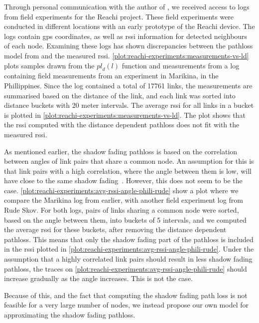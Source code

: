 Through personal communication with the author of \cite{paper:linkmodel}, we received access to logs from
field experiments for the Reachi project. These field experiments were conducted in different locations with
an early prototype of the Reachi device. The logs contain \gls{gps} coordinates, as well as \gls{rssi}
information for detected neighbours of each node. Examining these logs has shown discrepancies between the
\gls{pathloss} model from \cite{paper:linkmodel} and the measured \gls{rssi}.
\autoref{plot:reachi-experiments:measurements-vs-ld} plots samples drawn from the $\mathit{pl}_d(l)$ function
and measurements from a log containing field measurements from an experiment in Marikina, in the Phillippines.
Since the log contained a total of 17761 links, the measurements are summarised based on the distance of the
link, and each link was sorted into distance buckets with 20 meter intervals. The average \gls{rssi} for all
links in a bucket is plotted in \autoref{plot:reachi-experiments:measurements-vs-ld}. The plot shows that the
\gls{rssi} computed with the distance dependent \gls{pathloss} does not fit with the measured \gls{rssi}.
\medbreak

As mentioned earlier, the shadow fading \gls{pathloss} is based on the correlation between angles of link
pairs that share a common node. An assumption for this is that link pairs with a high correlation, where the
angle between them is low, will have close to the same shadow fading~\cite{paper:linkmodel}. However, this
does not seem to be the case. \autoref{plot:reachi-experiments:avg-rssi-angle-phili-rude} show a plot where we
compare the Marikina log from earlier, with another field experiment log from Rude Skov. For both logs, pairs
of links sharing a common node were sorted, based on the angle between them, into buckets of 5 \degree
intervals, and we computed the average \gls{rssi} for these buckets, after removing the distance dependent
\gls{pathloss}. This means that only the shadow fading part of the \gls{pathloss} is included in the
\gls{rssi} plotted in \autoref{plot:reachi-experiments:avg-rssi-angle-phili-rude}. Under the assumption that a
highly correlated link pairs should result in less shadow fading \gls{pathloss}, the traces on
\autoref{plot:reachi-experiments:avg-rssi-angle-phili-rude} should increase gradually as the angle increases.
This is not the case. \medbreak

Because of this, and the fact that computing the shadow fading path loss is not feasible for a very large
number of nodes, we instead propose our own model for approximating the shadow fading \gls{pathloss}.

